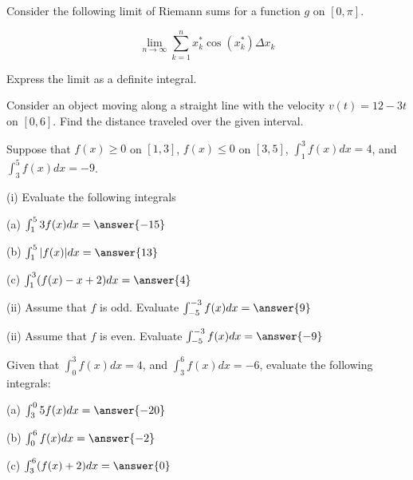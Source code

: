 \documentclass{ximera}
\begin{document}
\begin{exercise}
Consider the following limit of Riemann sums for a function $g$ on $[0, \pi]$. 

$$\lim_{n\to\infty}\sum_{k=1}^n x_k^* \cos(x_k^*)\Delta x_k$$

Express the limit as a definite integral.

\begin{multipleChoice}
\end{multipleChoice}
\end{exercise}

\begin{exercise}
Consider an object moving along a straight line with the velocity $v(t)=12-3t$ on $[0,6]$.  Find the distance traveled over the given interval.
\begin{multipleChoice}
\end{multipleChoice}
\end{exercise}

\begin{exercise}
Suppose that $f(x)\geq 0$ on $[1,3]$, $f(x)\leq 0$ on $[3,5]$, $\int_1^3f(x)dx=4$, and $\int_3^5f(x)dx=-9$.

(i) Evaluate the following integrals

(a) $\int_1^5 3f(x)dx=\answer{-15}$

(b) $\int_1^5 |f(x)|dx=\answer{13}$

(c) $\int_1^3 (f(x)-x+2)dx=\answer{4}$

(ii) Assume that $f$ is odd. Evaluate $\int_{-5}^{-3}f(x)dx=\answer{9}$

(ii) Assume that $f$ is even. Evaluate $\int_{-5}^{-3}f(x)dx=\answer{-9}$

\end{exercise}

\begin{exercise}
Given that $\int_0^3f(x)dx=4$, and $\int_3^6f(x)dx=-6$, evaluate the following integrals:

(a) $\int_3^0 5f(x)dx=\answer{-20}$

(b) $\int_0^6 f(x)dx=\answer{-2}$

(c) $\int_3^6 (f(x)+2)dx=\answer{0}$
\end{exercise}
\end{document}
